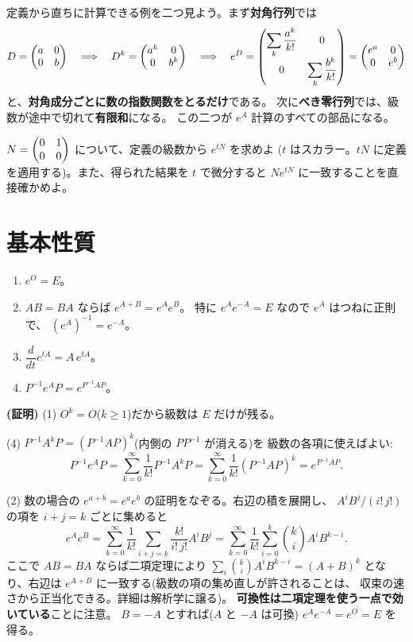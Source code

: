 定義から直ちに計算できる例を二つ見よう。まず\textbf{対角行列}では
\[
D = \begin{pmatrix}a & 0 \\ 0 & b\end{pmatrix} \quad\Longrightarrow\quad
D^k = \begin{pmatrix}a^k & 0 \\ 0 & b^k\end{pmatrix} \quad\Longrightarrow\quad
e^{D} = \begin{pmatrix}\displaystyle\sum_k \frac{a^k}{k!} & 0 \\
0 & \displaystyle\sum_k \frac{b^k}{k!}\end{pmatrix} = \begin{pmatrix}e^a & 0 \\ 0 & e^b\end{pmatrix}
\]
と、\textbf{対角成分ごとに数の指数関数をとるだけ}である。
次に\textbf{べき零行列}では、級数が途中で切れて\textbf{有限和}になる。
この二つが $e^{A}$ 計算のすべての部品になる。

\begin{mondai}\label{q:exp-shift}
$N = \begin{pmatrix}0 & 1 \\ 0 & 0\end{pmatrix}$ について、定義の級数から $e^{tN}$ を求めよ
($t$ はスカラー。$tN$ に定義を適用する)。また、得られた結果を
$t$ で微分すると $N e^{tN}$ に一致することを直接確かめよ。
\end{mondai}

\section{基本性質}

\begin{teiri}[基本性質]\label{thm:exp-basic}
\begin{enumerate}
\item $e^{O} = E$。
\item $AB = BA$ ならば $e^{A+B} = e^{A}e^{B}$。
特に $e^{A}e^{-A} = E$ なので $e^{A}$ はつねに正則で、
$(e^{A})^{-1} = e^{-A}$。
\item $\dfrac{d}{dt}e^{tA} = A\,e^{tA}$。
\item $P^{-1}e^{A}P = e^{P^{-1}AP}$。
\end{enumerate}
\end{teiri}

\noindent\textbf{(証明)}\quad
(1) $O^k = O$($k \ge 1$)だから級数は $E$ だけが残る。

(4) $P^{-1}A^kP = (P^{-1}AP)^k$(内側の $PP^{-1}$ が消える)を
級数の各項に使えばよい:
\[
P^{-1}e^{A}P = \sum_{k=0}^{\infty} \frac{1}{k!}P^{-1}A^kP
= \sum_{k=0}^{\infty} \frac{1}{k!}(P^{-1}AP)^k = e^{P^{-1}AP}.
\]

(2) 数の場合の $e^{a+b} = e^a e^b$ の証明をなぞる。右辺の積を展開し、
$A^i B^j / (i!\,j!)$ の項を $i + j = k$ ごとに集めると
\[
e^{A}e^{B} = \sum_{k=0}^{\infty} \frac{1}{k!}
\sum_{i+j=k} \frac{k!}{i!\,j!} A^i B^j
= \sum_{k=0}^{\infty} \frac{1}{k!}
\sum_{i=0}^{k} \binom{k}{i} A^i B^{k-i}.
\]
ここで $AB = BA$ ならば二項定理により
$\sum_i \binom{k}{i}A^iB^{k-i} = (A + B)^k$ となり、右辺は
$e^{A+B}$ に一致する(級数の項の集め直しが許されることは、
収束の速さから正当化できる。詳細は解析学に譲る)。
\textbf{可換性は二項定理を使う一点で効いている}ことに注意。
$B = -A$ とすれば($A$ と $-A$ は可換)
$e^{A}e^{-A} = e^{O} = E$ を得る。

